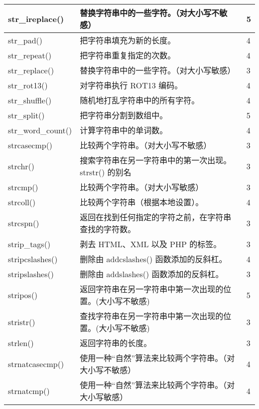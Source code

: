 \begin{longtable}{|m{120pt}|m{250pt}|m{20pt}|}
\hline
str\_ireplace()				&替换字符串中的一些字符。\newline（对大小写不敏感）	&5\\
\hline
str\_pad()					&把字符串填充为新的长度。	&4\\
\hline
str\_repeat()				&把字符串重复指定的次数。	&4\\
\hline
str\_replace()				&替换字符串中的一些字符。\newline（对大小写敏感）	&3\\
\hline
str\_rot13()					&对字符串执行 ROT13 编码。	&4\\
\hline
str\_shuffle()				&随机地打乱字符串中的所有字符。&	4\\
\hline
str\_split()					&把字符串分割到数组中。	&5\\
\hline
str\_word\_count()			&计算字符串中的单词数。&	4\\
\hline
strcasecmp()				&比较两个字符串。\newline（对大小写不敏感）&	3\\
\hline
strchr()						&搜索字符串在另一字符串中的第一次出现。\newline strstr() 的别名	&3\\
\hline
strcmp()					&比较两个字符串。\newline（对大小写敏感）	&3\\
\hline
strcoll()						&比较两个字符串（根据本地设置）。	&4\\
\hline
strcspn()					&返回在找到任何指定的字符之前，在字符串查找的字符数。&	3\\
\hline
strip\_tags()					&剥去 HTML、XML 以及 PHP 的标签。	&3\\
\hline
stripcslashes()				&删除由 addcslashes() 函数添加的反斜杠。&	4\\
\hline
stripslashes()				&删除由 addslashes() 函数添加的反斜杠。&	3\\
\hline
stripos()					&返回字符串在另一字符串中第一次出现的位置。\newline (大小写不敏感)	&5\\
\hline
stristr()						&查找字符串在另一字符串中第一次出现的位置。\newline (大小写不敏感)	&3\\
\hline
strlen()						&返回字符串的长度。	&3\\
\hline
strnatcasecmp()				&使用一种“自然”算法来比较两个字符串。\newline（对大小写不敏感）&	4\\
\hline
strnatcmp()					&使用一种“自然”算法来比较两个字符串。\newline（对大小写敏感）	&4\\

\end{longtable}
